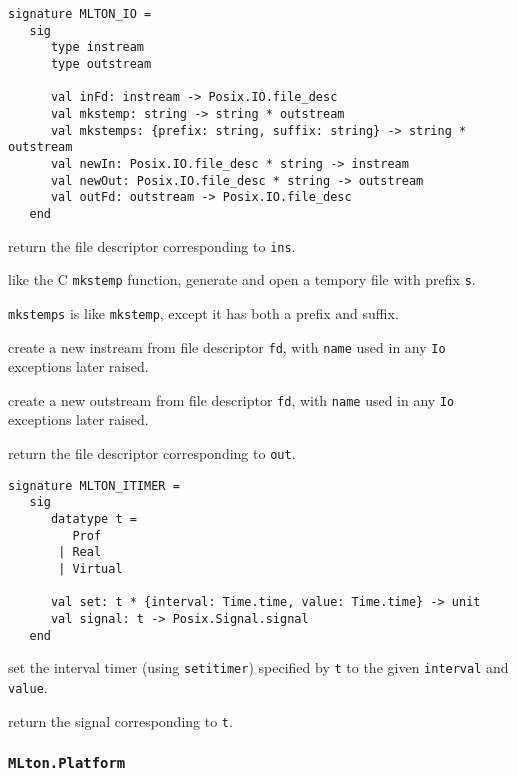
\begin{verbatim}
signature MLTON_IO =
   sig
      type instream
      type outstream

      val inFd: instream -> Posix.IO.file_desc
      val mkstemp: string -> string * outstream
      val mkstemps: {prefix: string, suffix: string} -> string * outstream
      val newIn: Posix.IO.file_desc * string -> instream
      val newOut: Posix.IO.file_desc * string -> outstream
      val outFd: outstream -> Posix.IO.file_desc
   end
\end{verbatim}

\begin{description}

 return the file descriptor corresponding to {\tt ins}.

like the C {\tt mkstemp} function, generate and open a tempory file with prefix
{\tt s}.

{\tt mkstemps} is like {\tt mkstemp}, except it has both a prefix and suffix.

 create a new instream from file descriptor
{\tt fd}, with {\tt name} used in any {\tt Io} exceptions later
raised.

 create a new outstream from file descriptor
{\tt  fd}, with {\tt name} used in any {\tt Io} exceptions later
raised.

 return the file descriptor corresponding to
{\tt out}.
\end{description}


\begin{verbatim}
signature MLTON_ITIMER =
   sig
      datatype t =
         Prof
       | Real
       | Virtual

      val set: t * {interval: Time.time, value: Time.time} -> unit
      val signal: t -> Posix.Signal.signal
   end
\end{verbatim}

\begin{description}
set the interval timer (using {\tt setitimer}) specified by {\tt t} to
the given {\tt interval} and {\tt value}.

return the signal corresponding to {\tt t}.
\end{description}
%
\subsubsection{\tt MLton.Platform}

